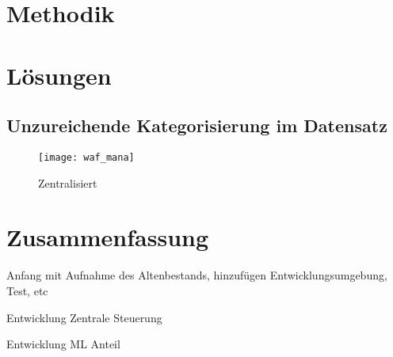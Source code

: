 \section{Methodik}


\section{Lösungen}

\subsection{Unzureichende Kategorisierung im Datensatz}


\begin{figure}[ht]
  \begin{center}
    \texttt{[image: waf\_mana]}
    \caption{Zentralisiert~\cite{Manaseer2018}}
    \label{fig.topten}
  \end{center}
\end{figure}




\section{Zusammenfassung}

\begin{neu}
  Anfang mit Aufnahme des Altenbestands, hinzufügen Entwicklungsumgebung, Test, etc

  Entwicklung Zentrale Steuerung

  Entwicklung ML Anteil
\end{neu}